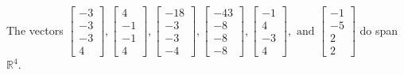 \begin{exercise}
\begin{exerciseStatement}
  \end{exerciseStatement}
  \begin{exerciseAnswer}
   The vectors \(\left[\begin{array}{r}
-3 \\
-3 \\
-3 \\
4
\end{array}\right] , \left[\begin{array}{r}
4 \\
-1 \\
-1 \\
4
\end{array}\right] , \left[\begin{array}{r}
-18 \\
-3 \\
-3 \\
-4
\end{array}\right] , \left[\begin{array}{r}
-43 \\
-8 \\
-8 \\
-8
\end{array}\right] , \left[\begin{array}{r}
-1 \\
4 \\
-3 \\
4
\end{array}\right] , \text{ and } \left[\begin{array}{r}
-1 \\
-5 \\
2 \\
2
\end{array}\right]\) 
  	 do  
	span \(\mathbb{R}^4\).
  


  \end{exerciseAnswer}
\end{exercise}